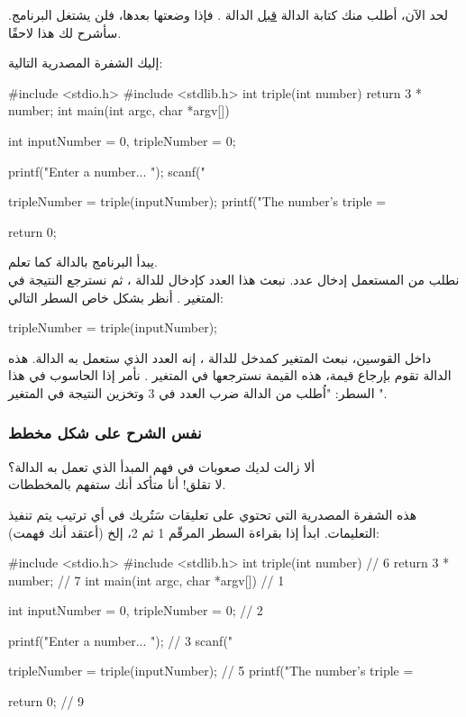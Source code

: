 لحد الآن، أطلب منك كتابة الدالة 
\underline{قبل}
الدالة 
.
فإذا وضعتها بعدها، فلن يشتغل البرنامج. سأشرح لك هذا لاحقًا.

إليك الشفرة المصدرية التالية:

\begin{Csource}
#include <stdio.h>
#include <stdlib.h>
int triple(int number)
{
	return 3 * number;
}   
int main(int argc, char *argv[])
{
	int inputNumber = 0, tripleNumber = 0;
	
	printf("Enter a number... ");
	scanf("%
	
	tripleNumber = triple(inputNumber);
	printf("The number's triple = %
	
	return 0;
}
\end{Csource}

يبدأ البرنامج بالدالة 
كما تعلم.\\
نطلب من المستعمل إدخال عدد. نبعث هذا العدد كإدخال للدالة 
،
ثم نسترجع النتيجة في المتغير 
.
أنظر بشكل خاص السطر التالي:

\begin{Csource}
tripleNumber = triple(inputNumber);
\end{Csource}

داخل القوسين، نبعث المتغير كمدخل للدالة 
،
إنه العدد الذي ستعمل به الدالة. هذه الدالة تقوم بإرجاع قيمة، هذه القيمة نسترجعها في المتغير 
.
نأمر إذا الحاسوب في هذا السطر: "اُطلب من الدالة 
ضرب العدد
في 3 وتخزين النتيجة في المتغير 
".

\subsubsection{نفس الشرح على شكل مخطط}

ألا زالت لديك صعوبات في فهم المبدأ الذي تعمل به الدالة؟\\
لا تقلق! أنا متأكد أنك ستفهم بالمخططات.

هذه الشفرة المصدرية التي تحتوي على تعليقات سَتُريك في أي ترتيب يتم تنفيذ التعليمات. ابدأ إذا بقراءة السطر المرقّم 1 ثم 2، إلخ (أعتقد أنك فهمت):

\begin{Csource}
#include <stdio.h>
#include <stdlib.h>
int triple(int number) // 6
{
	return 3 * number; // 7
}   
int main(int argc, char *argv[]) // 1
{
	int inputNumber = 0, tripleNumber = 0; // 2
	
	printf("Enter a number... "); // 3
	scanf("%
	
	tripleNumber = triple(inputNumber); // 5
	printf("The number's triple = %
	
	return 0; // 9
}
\end{Csource}

